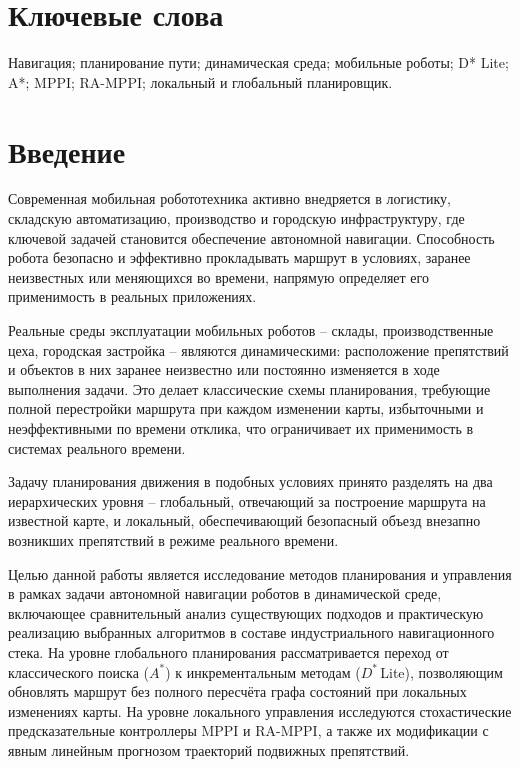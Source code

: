 \documentclass[a4paper,12pt]{extarticle}
\begin{document}
    \section*{Ключевые слова}
    Навигация; планирование пути; динамическая среда; мобильные роботы; D* Lite; A*; MPPI; RA-MPPI; локальный и глобальный планировщик.
    \pagebreak

\section{Введение}\label{sec:introduce}

Современная мобильная робототехника активно внедряется в логистику, складскую автоматизацию, производство и городскую инфраструктуру, где ключевой задачей становится обеспечение автономной навигации. Способность робота безопасно и эффективно прокладывать маршрут в условиях, заранее неизвестных или меняющихся во времени, напрямую определяет его применимость в реальных приложениях.

Реальные среды эксплуатации мобильных роботов -- склады, производственные цеха, городская застройка -- являются динамическими: расположение препятствий и объектов в них заранее неизвестно или постоянно изменяется в ходе выполнения задачи. Это делает классические схемы планирования, требующие полной перестройки маршрута при каждом изменении карты, избыточными и неэффективными по времени отклика, что ограничивает их применимость в системах реального времени.

Задачу планирования движения в подобных условиях принято разделять на два иерархических уровня -- глобальный, отвечающий за построение маршрута на известной карте, и локальный, обеспечивающий безопасный объезд внезапно возникших препятствий в режиме реального времени.

Целью данной работы является исследование методов планирования и управления в рамках задачи автономной навигации роботов в динамической среде, включающее сравнительный анализ существующих подходов и практическую реализацию выбранных алгоритмов в составе индустриального навигационного стека. На уровне глобального планирования рассматривается переход от классического поиска ($A^*$) к инкрементальным методам ($D^*$\,Lite), позволяющим обновлять маршрут без полного пересчёта графа состояний при локальных изменениях карты. На уровне локального управления исследуются стохастические предсказательные контроллеры MPPI и RA-MPPI, а также их модификации с явным линейным прогнозом траекторий подвижных препятствий.
\end{document}
